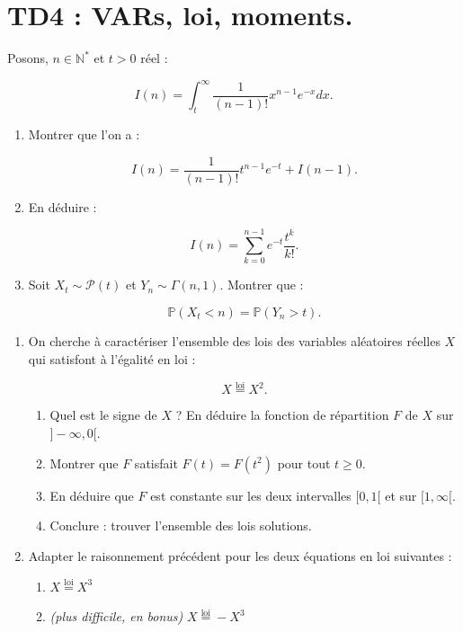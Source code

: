 \chapter*{TD4 : VARs, loi, moments.}

\setcounter{exercice}{0}

\begin{mdframed}
\begin{exercice} 
Posons, $n \in \mathbb{N}^*$ et $t > 0$ réel :

$$
I(n) = \int_t^\infty \frac{1}{(n - 1)!} x^{n-1}e^{-x} dx.
$$

\begin{enumerate}
    \item Montrer que l'on a :
    
    $$
    I(n) = \frac{1}{(n - 1)!} t^{n-1}e^{-t} + I(n - 1).
    $$
    \item En déduire :
    
    $$
    I(n) = \sum_{k=0}^{n-1} e^{-t} \frac{t^k}{k!}.
    $$
    \item Soit $X_t \sim \mathcal{P}(t)$ et $Y_n \sim \Gamma(n, 1)$. Montrer que :
    
    $$
    \mathbb{P}(X_t < n) = \mathbb{P}(Y_n > t).
    $$
\end{enumerate}
\end{exercice}
\end{mdframed}

\medskip

\begin{mdframed}
\begin{exercice}
\begin{enumerate}
    \item On cherche à caractériser l'ensemble des lois des variables aléatoires réelles $X$ qui satisfont à l'égalité en loi :
    
    $$
    X \overset{\text{loi}}{=} X^2.
    $$
    \begin{enumerate}
        \item Quel est le signe de $X$ ? En déduire la fonction de répartition $F$ de $X$ sur $]-\infty, 0[$.
        \item Montrer que $F$ satisfait $F(t) = F(t^2)$ pour tout $t \geq 0$.
        \item En déduire que $F$ est constante sur les deux intervalles $[0, 1[$ et sur $[1, \infty[$.
        \item Conclure : trouver l'ensemble des lois solutions.
    \end{enumerate}
    \item Adapter le raisonnement précédent pour les deux équations en loi suivantes :
    \begin{enumerate}
        \item $X \overset{\text{loi}}{=} X^3$
        \item \textit{(plus difficile, en bonus)} $X \overset{\text{loi}}{=} -X^3$
    \end{enumerate}
\end{enumerate}
\end{exercice}
\end{mdframed}

